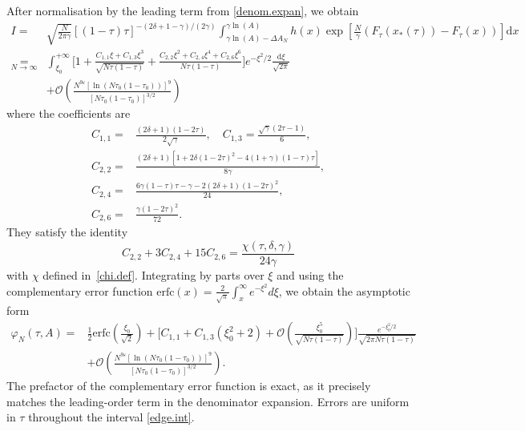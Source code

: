 \documentclass[pdflatex,sn-mathphys-num]{sn-jnl}
\theoremstyle{thmstyleone}
\numberwithin{equation}{section}
\begin{document}
After normalisation by the leading term from \eqref{denom.expan}, we obtain
\begin{equation}
\begin{split}
I=&\sqrt{\frac{N}{2\pi\gamma}}[(1-\tau)\tau]^{-(2\delta+1-\gamma)/(2\gamma)}\int_{\gamma\ln(A)-\Delta A_N}^{\gamma\ln(A)}h\left( x \right)\exp\left[ \frac{N}{\gamma}(F_{\tau}\left( x_*(\tau) \right)-F_{\tau}\left( x \right))\right]\mathrm{d}x\\
\underset{N\to\infty}{=}&\int_{\xi_0}^{+\infty}\biggl[1+\frac{C_{1,1}\xi+C_{1,3}\xi^3}{\sqrt{N\tau(1-\tau)}}+\frac{C_{2,2}\xi^2+C_{2,4}\xi^4+C_{2,6}\xi^6}{N\tau(1-\tau)}\biggl]e^{-\xi^2/2}\frac{\mathrm{d}\xi}{\sqrt{2\pi}}\\
&+\mathcal{O}\left(\frac{N^{9\varepsilon}[\ln(N\tau_0(1-\tau_0))]^9}{[N\tau_0(1-\tau_0)]^{3/2}}\right)
\end{split}
\end{equation}
where the coefficients are
\begin{equation}
\begin{split}
C_{1,1}=&\frac{(2\delta+1)(1-2\tau)}{2\sqrt{\gamma}},\quad C_{1,3}=\frac{\sqrt{\gamma}(2\tau-1)}{6},\\
C_{2,2}=&\frac{(2\delta+1)[1+2\delta(1-2\tau)^2-4(1+\gamma)(1-\tau)\tau]}{8\gamma},\\
C_{2,4}=&\frac{6\gamma(1-\tau)\tau-\gamma-2(2\delta+1)(1-2\tau)^2}{24},\\
C_{2,6}=&\frac{\gamma(1-2\tau)^2}{72}.
\end{split}
\end{equation}
They satisfy the identity
\begin{equation}
   C_{2,2}+3C_{2,4}+15C_{2,6}=\frac{\chi(\tau,\delta,\gamma)}{24\gamma}
\end{equation}
with $\chi$ defined in~\eqref{chi.def}.
Integrating by parts over $\xi$ and using the complementary error function $\mathrm {erfc}(x)=\frac{2}{\sqrt{\pi}}\int_x^\infty e^{-\xi^2}d\xi$, we obtain the asymptotic form
\begin{equation}\label{expand.phi.1}
\begin{split}
    \varphi_N(\tau,A)=&\frac{1}{2}\mathrm {erfc}\left(\frac{\xi_0}{\sqrt{2}}\right)+\biggl[C_{1,1}+C_{1,3}(\xi_0^2+2)+\mathcal{O}\left(\frac{\xi_0^5}{\sqrt{N\tau(1-\tau)}}\right)\biggl]\frac{e^{-\xi_0^2/2}}{\sqrt{2\pi N\tau(1-\tau)}}\\
    &+\mathcal{O}\left(\frac{N^{9\varepsilon}[\ln(N\tau_0(1-\tau_0))]^9}{[N\tau_0(1-\tau_0)]^{3/2}}\right).
\end{split}
\end{equation}
The prefactor of the complementary error function is exact, as it precisely matches the leading-order term in the denominator expansion. Errors are uniform in $\tau$ throughout the interval \eqref{edge.int}.
\end{document}
